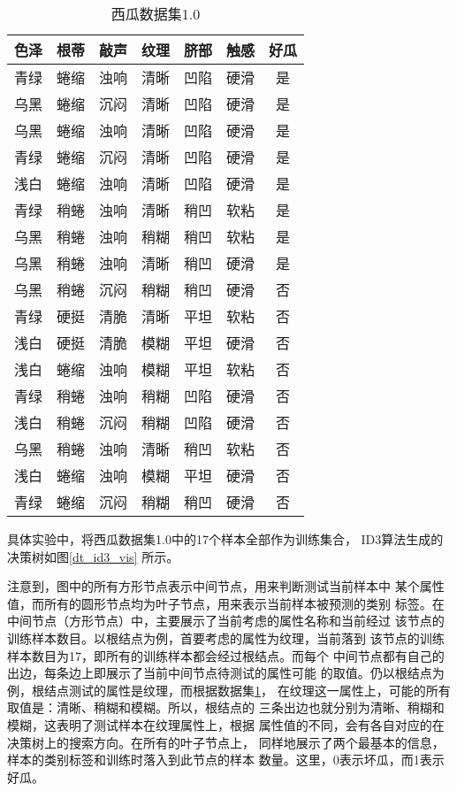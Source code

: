 \documentclass[main.tex]{subfiles}
\begin{document}
\begin{table}[]
    \caption{西瓜数据集1.0}
    \label{watermelon_1}
    \centering
    \begin{tabular}{ccccccc}
    \hline
    色泽 & 根蒂 & 敲声 & 纹理 & 脐部 & 触感 & 好瓜 \\ \hline
    青绿 & 蜷缩 & 浊响 & 清晰 & 凹陷 & 硬滑 & 是  \\
    乌黑 & 蜷缩 & 沉闷 & 清晰 & 凹陷 & 硬滑 & 是  \\
    乌黑 & 蜷缩 & 浊响 & 清晰 & 凹陷 & 硬滑 & 是  \\
    青绿 & 蜷缩 & 沉闷 & 清晰 & 凹陷 & 硬滑 & 是  \\
    浅白 & 蜷缩 & 浊响 & 清晰 & 凹陷 & 硬滑 & 是  \\
    青绿 & 稍蜷 & 浊响 & 清晰 & 稍凹 & 软粘 & 是  \\
    乌黑 & 稍蜷 & 浊响 & 稍糊 & 稍凹 & 软粘 & 是  \\
    乌黑 & 稍蜷 & 浊响 & 清晰 & 稍凹 & 硬滑 & 是  \\ \hline
    乌黑 & 稍蜷 & 沉闷 & 稍糊 & 稍凹 & 硬滑 & 否  \\
    青绿 & 硬挺 & 清脆 & 清晰 & 平坦 & 软粘 & 否  \\
    浅白 & 硬挺 & 清脆 & 模糊 & 平坦 & 硬滑 & 否  \\
    浅白 & 蜷缩 & 浊响 & 模糊 & 平坦 & 软粘 & 否  \\
    青绿 & 稍蜷 & 浊响 & 稍糊 & 凹陷 & 硬滑 & 否  \\
    浅白 & 稍蜷 & 沉闷 & 稍糊 & 凹陷 & 硬滑 & 否  \\
    乌黑 & 稍蜷 & 浊响 & 清晰 & 稍凹 & 软粘 & 否  \\
    浅白 & 蜷缩 & 浊响 & 模糊 & 平坦 & 硬滑 & 否  \\
    青绿 & 蜷缩 & 沉闷 & 稍糊 & 稍凹 & 硬滑 & 否  \\ \hline
    \end{tabular}
\end{table}

具体实验中，将西瓜数据集1.0中的17个样本全部作为训练集合，
ID3算法生成的决策树如图\ref{dt_id3_vis}
所示。

注意到，图中的所有方形节点表示中间节点，用来判断测试当前样本中
某个属性值，而所有的圆形节点均为叶子节点，用来表示当前样本被预测的类别
标签。在中间节点（方形节点）中，主要展示了当前考虑的属性名称和当前经过
该节点的训练样本数目。以根结点为例，首要考虑的属性为纹理，当前落到
该节点的训练样本数目为17，即所有的训练样本都会经过根结点。而每个
中间节点都有自己的出边，每条边上即展示了当前中间节点待测试的属性可能
的取值。仍以根结点为例，根结点测试的属性是纹理，而根据数据集\ref{watermelon_1}，
在纹理这一属性上，可能的所有取值是：清晰、稍糊和模糊。所以，根结点的
三条出边也就分别为清晰、稍糊和模糊，这表明了测试样本在纹理属性上，根据
属性值的不同，会有各自对应的在决策树上的搜索方向。在所有的叶子节点上，
同样地展示了两个最基本的信息，样本的类别标签和训练时落入到此节点的样本
数量。这里，0表示坏瓜，而1表示好瓜。
\end{document}
